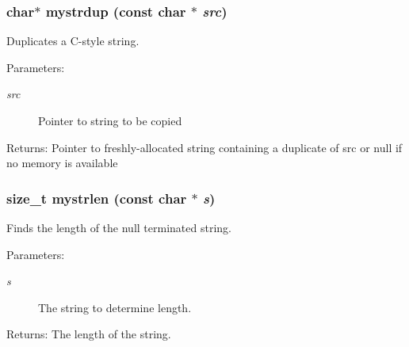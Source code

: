\subsubsection{\setlength{\rightskip}{0pt plus 5cm}char$\ast$ mystrdup (const char $\ast$ {\em src})}\label{mystring_8c_148a52c665d88f52fb4995338a319d3c}


Duplicates a C-style string. \begin{Desc}
\item[Parameters:]
\begin{description}
\item[{\em src}]Pointer to string to be copied \end{description}
\end{Desc}
\begin{Desc}
\item[Returns:]Pointer to freshly-allocated string containing a duplicate of src or null if no memory is available \end{Desc}
\subsubsection{\setlength{\rightskip}{0pt plus 5cm}size\_\-t mystrlen (const char $\ast$ {\em s})}\label{mystring_8c_a231246d7f6f97231aa18689cc2ea20a}


Finds the length of the null terminated string. 

\begin{Desc}
\item[Parameters:]
\begin{description}
\item[{\em s}]The string to determine length. \end{description}
\end{Desc}
\begin{Desc}
\item[Returns:]The length of the string. \end{Desc}

